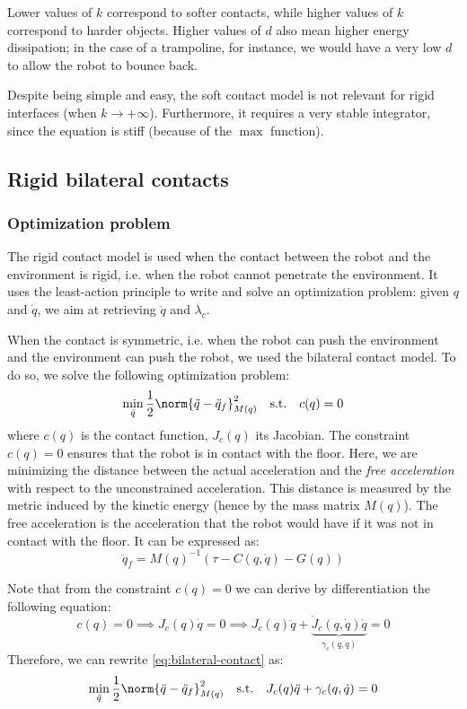 Lower values of $k$ correspond to softer contacts, while higher values of $k$ correspond to harder objects. Higher values of $d$ also mean higher energy dissipation; in the case of a trampoline, for instance, we would have a very low $d$ to allow the robot to bounce back.

Despite being simple and easy, the soft contact model is not relevant for rigid interfaces (when $k\to+\infty$). Furthermore, it requires a very stable integrator, since the equation is stiff (because of the $\max$ function).

\subsection{Rigid bilateral contacts}
\subsubsection{Optimization problem}
The rigid contact model is used when the contact between the robot and the environment is rigid, i.e. when the robot cannot penetrate the environment. It uses the least-action principle to write and solve an optimization problem: given $q$ and $\dot{q}$, we aim at retrieving $\ddot{q}$ and $\lambda_c$.

When the contact is symmetric, i.e. when the robot can push the environment and the environment can push the robot, we used the bilateral contact model. To do so, we solve the following optimization problem:
\begin{equation}
    \label{eq:bilateral-contact}
    \min_{\ddot{q}} \frac{1}{2}\norm{\ddot{q}-\ddot{q}_f}^2_{M(q)} \quad\text{s.t.}\quad c(q)=0
\end{equation}
where $c(q)$ is the contact function, $J_c(q)$ its Jacobian. The constraint $c(q)=0$ ensures that the robot is in contact with the floor. Here, we are minimizing the distance between the actual acceleration and the \emph{free acceleration} with respect to the unconstrained acceleration. This distance is measured by the metric induced by the kinetic energy (hence by the mass matrix $M(q)$). The free acceleration is the acceleration that the robot would have if it was not in contact with the floor. It can be expressed as:
\begin{equation*}
    \ddot{q}_f = M(q)^{-1}(\tau - C(q, \dot{q}) - G(q))
\end{equation*}

Note that from the constraint $c(q)=0$ we can derive by differentiation the following equation:
\begin{equation*}
    c(q)=0\implies J_c(q)\dot{q}=0 \implies J_c(q)\ddot{q} + \underbrace{\dot{J}_c(q,\dot{q})\dot{q}}_{\gamma_c(q, \dot{q})} = 0
\end{equation*}
Therefore, we can rewrite \autoref{eq:bilateral-contact} as:
\begin{equation}
    \min_{\ddot{q}} \frac{1}{2}\norm{\ddot{q}-\ddot{q}_f}^2_{M(q)} \quad\text{s.t.}\quad J_c(q)\ddot{q} + \gamma_c(q, \dot{q}) = 0
\end{equation}

